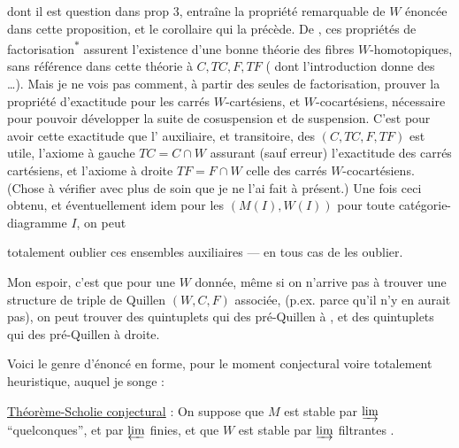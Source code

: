 dont il est question dans prop 3,  entraîne
la propriété remarquable de $W$ énoncée
dans cette proposition, et  le corollaire
qui la précède.  De \unsure{$=$}, ces propriétés
de factorisation\textsuperscript{$*$} assurent l'existence d'une
bonne théorie des fibres  $W$-homotopiques,
sans  référence dans cette théorie à $C,TC,F,TF$
( dont l'introduction donne  des  \ldots). Mais je ne vois pas comment,
à partir des seules  de factorisation,
prouver la propriété  d'exactitude
pour les carrés $W$-cartésiens, et
$W$-cocartésiens, nécessaire pour pouvoir
développer la suite  de cosuspension
et de suspension. C'est pour avoir cette
exactitude que l' auxiliaire,
et transitoire, des  $(C,TC,F,TF)$
est utile, l'axiome  à gauche $TC=C\cap W$
assurant (sauf erreur) l'exactitude des
carrés cartésiens, et l'axiome à droite
$TF=F\cap W$ celle des carrés $W$-cocartésiens.
(Chose à vérifier avec plus de soin que je
ne l'ai fait à présent.) Une fois ceci obtenu,
et éventuellement idem pour les $(M(I),W(I))$
pour toute catégorie-diagramme $I$, on peut

totalement oublier ces ensembles auxiliaires
---  en tous cas de les oublier.

Mon espoir, c'est que pour une $W$ donnée,
même si on n'arrive pas à trouver
une structure de triple de Quillen
$(W,C,F)$ associée, (p.ex. parce qu'il n'y en
aurait pas), on peut trouver  des
quintuplets  qui  des pré-Quillen à ,
et des quintuplets  qui  des pré-Quillen
à droite.

Voici le genre d'énoncé en forme,
pour le moment conjectural voire totalement
heuristique, auquel je songe :

\uline{Théorème-Scholie conjectural} : On suppose
que $M$ est stable par $\varinjlim$ ``quelconques'',
et par $\varprojlim$ finies, et que $W$ est
stable par $\varinjlim$ filtrantes  .

